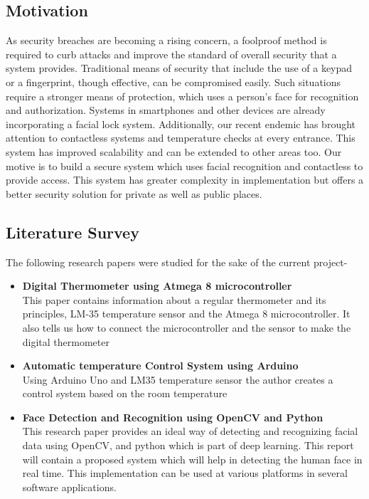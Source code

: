 \documentclass[conference]{IEEEtran}
\begin{document}
	
	
	\subsection{Motivation}
	As security breaches are becoming a rising concern, a foolproof method is required to curb attacks and improve the standard of overall security that a system provides. Traditional means of security that include the use of a keypad or a fingerprint, though effective, can be compromised easily. Such situations require a stronger means of protection, which uses a person’s face for recognition and authorization. Systems in smartphones and other devices are already incorporating a facial lock system. Additionally, our recent endemic has brought attention to contactless systems and temperature checks at every entrance. This system has improved scalability and can be extended to other areas too. Our motive is to build a secure system which uses facial recognition and contactless to provide access. This system has greater complexity in implementation but offers a better security solution for private as well as public places.
	
	\subsection{Literature Survey}
	The following research papers were studied for the sake of the current project-
	\begin{itemize}
		\item\textbf{Digital Thermometer using Atmega 8
			microcontroller}\cite{a} \\This paper contains information about a
		regular thermometer and its principles,
		LM-35 temperature sensor and the Atmega
		8 microcontroller. It also tells us how to
		connect the microcontroller and the sensor
		to make the digital thermometer
		\item \textbf{Automatic temperature Control System using
			Arduino}\cite{b} \\Using Arduino Uno and LM35
		temperature sensor the author creates a
		control system based on the room
		temperature
		\item \textbf{Face Detection and Recognition using OpenCV
			and Python}\cite{d} \\This research paper provides an ideal way of
		detecting and recognizing facial data
		using OpenCV, and python which is part of
		deep learning. This report will contain a
		proposed system which will help in
		detecting the human face in real time. This
		implementation can be used at various
		platforms in several software applications.
	\end{itemize}
\end{document}
